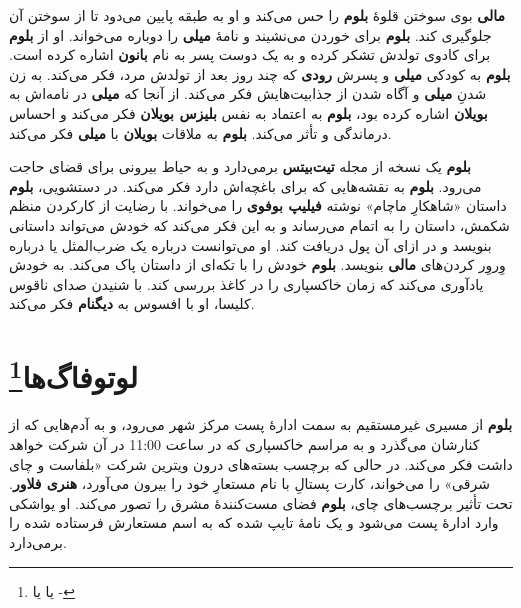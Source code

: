 \documentclass[12pt]{book}
\newcommand{\noun}[1]{{\textbf{#1}}}
\begin{document}
    \noun{مالی} بوی سوختن قلوهٔ \noun{بلوم} را حس می‌کند و او به طبقه پایین می‌دود تا از سوختن آن جلوگیری کند. \noun{بلوم} برای خوردن می‌نشیند و نامهٔ \noun{میلی} را دوباره می‌خواند. او از \noun{بلوم} برای کادوی تولدش تشکر کرده و به یک دوست پسر به نام \noun{بانون} اشاره کرده است. \noun{بلوم} به کودکی \noun{میلی} و پسرش \noun{رودی} که چند روز بعد از تولدش مرد، فکر می‌کند. به زن شدنِ \noun{میلی} و آگاه شدن از جذابیت‌هایش فکر می‌کند. از آنجا که \noun{میلی} در نامه‌اش به \noun{بویلان} اشاره کرده بود، \noun{بلوم} به اعتماد به نفس \noun{بلیزس بویلان‬} فکر می‌کند و احساس درماندگی و تأثر می‌کند. \noun{بلوم} به ملاقات \noun{بویلان} با \noun{میلی} فکر می‌کند.

    \noun{بلوم} یک نسخه از مجله \noun{تیت‌بیتس} برمی‌دارد و به حیاط بیرونی برای قضای حاجت می‌رود. \noun{بلوم} به نقشه‌هایی که برای باغچه‌اش دارد فکر می‌کند. در دستشویی، \noun{بلوم} داستان «شاهکارِ ماچام» نوشته \noun{فیلیپ بوفوی} را می‌خواند. با رضایت از کارکردن منظم شکمش، داستان را به اتمام می‌رساند و به این فکر می‌کند که خودش می‌تواند داستانی بنویسد و در ازای آن پول دریافت کند. او می‌توانست درباره یک ضرب‌المثل یا درباره وِروِر کردن‌های \noun{مالی} بنویسد. \noun{بلوم} خودش را با تکه‌ای از داستان پاک می‌کند. به خودش یادآوری می‌کند که زمان خاکسپاری را در کاغذ بررسی کند. با شنیدن صدای ناقوس کلیسا، او با افسوس به \noun{دیگنام} فکر می‌کند.

    \chapter[لوتوفاگ‌ها]{لوتوفاگ‌ها\protect\footnote{ یا  یا -}}\label{ep:5}
    \noun{بلوم} از مسیری غیرمستقیم به سمت ادارهٔ پست مرکز شهر می‌رود، و به آدم‌هایی که از کنارشان می‌گذرد و به مراسم خاکسپاری که در ساعت 11:00 در آن شرکت خواهد داشت فکر می‌کند. در حالی که برچسب بسته‌های درون ویترین شرکت «بلفاست و چای شرقی» را می‌خواند، کارت پستالِ با نام مستعارِ خود را بیرون می‌آورد، \noun{هنری فلاور}. تحت تأثیر برچسب‌های چای، \noun{بلوم} فضای مست‌کنندهٔ مشرق را تصور می‌کند. او یواشکی وارد ادارهٔ پست می‌شود و یک نامهٔ تایپ شده که به اسم مستعارش فرستاده شده را برمی‌دارد.
\end{document}
